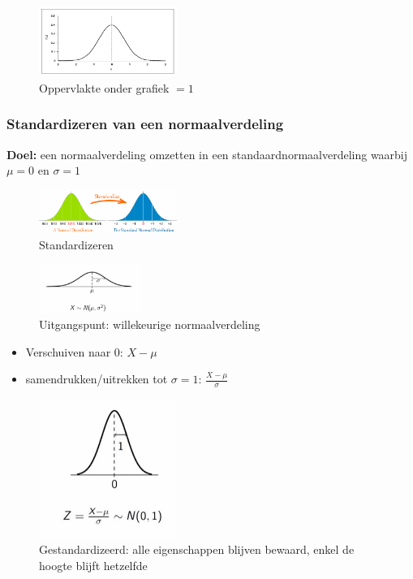 \documentclass{article}
\begin{document}
\begin{figure}[H]
    \centering
    \includegraphics[width=0.4\textwidth]{standaardnormaalverdeling.png}
    \caption{Oppervlakte onder grafiek $=1$}
\end{figure}

\subsubsection{Standardizeren van een normaalverdeling}

\textbf{Doel:} een normaalverdeling omzetten in een standaardnormaalverdeling waarbij $\mu = 0$ en $\sigma = 1$

\begin{figure}[H]
    \centering
    \includegraphics[width=0.4\textwidth]{standardizeren.png}
    \caption{Standardizeren}
\end{figure}

\begin{figure}[H]
    \centering
    \includegraphics[width=0.3\textwidth]{gauss-notatiewijze.png}
    \caption{Uitgangspunt: willekeurige normaalverdeling}
\end{figure}

\begin{itemize}
    \item Verschuiven naar $0$: $X - \mu$
    \item samendrukken/uitrekken tot $\sigma = 1$: $\frac{X - \mu}{\sigma}$
\end{itemize}


\begin{figure}[H]
    \centering
    \includegraphics[width=0.4\textwidth]{gestandardizeerd.png}
    \caption{Gestandardizeerd: alle eigenschappen blijven bewaard, enkel de hoogte blijft hetzelfde}
\end{figure}
\end{document}
